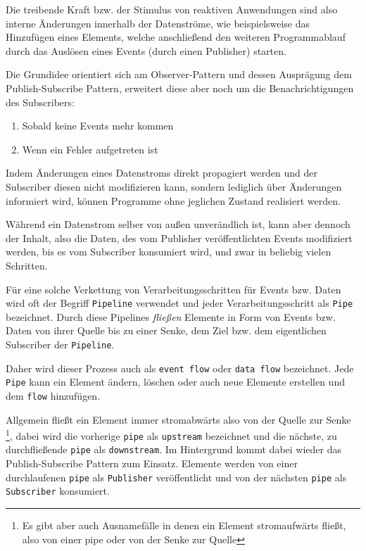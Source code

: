 Die treibende Kraft bzw. der Stimulus von reaktiven Anwendungen sind also interne Änderungen innerhalb der Datenströme, wie beispielsweise das
Hinzufügen eines Elements, welche anschließend den weiteren Programmablauf durch das Auslösen eines Events (durch einen Publisher) starten.

Die Grundidee orientiert sich am Observer-Pattern und dessen Ausprägung dem Publish-Subscribe Pattern, erweitert diese aber
noch um die Benachrichtigungen des Subscribers:
\begin{enumerate}
	\item Sobald keine Events mehr kommen
	\item Wenn ein Fehler aufgetreten ist
\end{enumerate}
Indem Änderungen eines Datenstroms direkt propagiert werden und der Subscriber diesen nicht modifizieren kann, sondern lediglich über Änderungen informiert wird,
können Programme ohne jeglichen Zustand realisiert werden\parencite{Escoffier2017}.

Während ein Datenstrom selber von außen unverändlich ist, kann aber dennoch der Inhalt, also die Daten,
des vom Publisher veröffentlichten Events modifiziert werden, bis es vom
Subscriber konsumiert wird, und zwar in beliebig vielen Schritten.

Für eine solche Verkettung von Verarbeitungsschritten für Events bzw. Daten
wird oft der Begriff \verb|Pipeline| verwendet und jeder Verarbeitungsschritt als \verb|Pipe| bezeichnet.
Durch diese Pipelines \textit{fließen} Elemente in Form von Events bzw. Daten von ihrer Quelle
bis zu einer Senke, dem Ziel bzw. dem eigentlichen Subscriber der \verb|Pipeline|.

Daher wird dieser Prozess auch als \verb|event flow| oder \verb|data flow| bezeichnet.
Jede \verb|Pipe| kann ein Element ändern, löschen oder auch neue Elemente erstellen und dem \verb|flow| hinzufügen.

Allgemein fließt ein Element immer stromabwärts also von der Quelle zur Senke
\footnote{Es gibt aber auch Ausnamefälle in denen ein Element stromaufwärts fließt, also von einer pipe oder von der Senke zur Quelle},
dabei wird die vorherige \verb|pipe| als \verb|upstream| bezeichnet und die nächste, zu durchfließende \verb|pipe| als \verb|downstream|.
Im Hintergrund kommt dabei wieder das Publish-Subscribe Pattern zum Einsatz. Elemente werden von einer durchlaufenen \verb|pipe| als \verb|Publisher|
veröffentlicht und von der nächsten \verb|pipe| als \verb|Subscriber| konsumiert.

